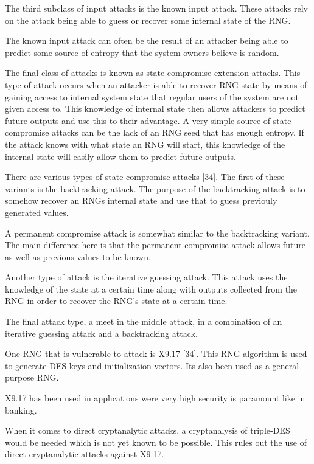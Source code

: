 \documentclass{article}
\begin{document}
    The third subclass of input attacks is the known input attack. These attacks
    rely on the attack being able to guess or recover some internal state of the RNG.

    The known input attack can often be the result of an attacker being able to
    predict some source of entropy that the system owners believe is random.

    The final class of attacks is known as state compromise extension attacks.
    This type of attack occurs when an attacker is able to recover RNG state
    by means of gaining access to internal system state that regular users of the system
    are not given access to. This knowledge of internal state then allows attackers
    to predict future outputs and use this to their advantage.
    A very simple source of state compromise attacks can be the lack of an RNG
    seed that has enough entropy. If the attack knows with what state an RNG
    will start, this knowledge of the internal state will easily allow them
    to predict future outputs.

    There are various types of state compromise attacks [34].
    The first of these variants is the backtracking attack. The purpose
    of the backtracking attack is to somehow recover an RNGs internal state
    and use that to guess previouly generated values.

    A permanent compromise attack is somewhat similar to the backtracking variant.
    The main difference here is that the permanent compromise attack
    allows future as well as previous values to be known.

    Another type of attack is the iterative guessing attack. This attack uses
    the knowledge of the state at a certain time along with outputs collected
    from the RNG in order to recover the RNG's state at a certain time.

    The final attack type, a meet in the middle attack, in a combination
    of an iterative guessing attack and a backtracking attack.


    One RNG that is vulnerable to attack is X9.17 [34]. This RNG algorithm
    is used to generate DES keys and initialization vectors.
    Its also been used as a general purpose RNG.

    X9.17 has been used in applications were very high security is paramount like in
    banking.

    When it comes to direct cryptanalytic attacks, a cryptanalysis of triple-DES
    would be needed which is not yet known to be possible.
    This rules out the use of direct cryptanalytic attacks against X9.17.
\end{document}
